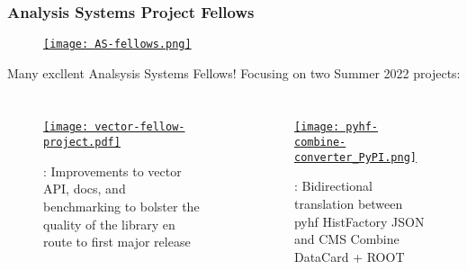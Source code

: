 \begin{frame}
  \frametitle{Analysis Systems Project Fellows}


  \begin{figure}
    \begin{center}
      \href{https://iris-hep.org/as.html}{\texttt{[image: AS-fellows.png]}}
    \end{center}
  \end{figure}

  \begin{center}
    Many excllent Analsysis Systems Fellows! Focusing on two Summer 2022 projects:
  \end{center}

  \begin{columns}
    \begin{figure}
        \begin{center}
            \href{https://iris-hep.org/fellows/Saransh-cpp.html}{\texttt{[image: vector-fellow-project.pdf]}}
        \end{center}
        : Improvements to vector API, docs, and benchmarking to bolster the quality of the library en route to first major release
    \end{figure}
%
    \vspace{10pt}
    \begin{figure}
        \begin{center}
            \href{https://iris-hep.org/fellows/peterridolfi.html}{\texttt{[image: pyhf-combine-converter\_PyPI.png]}}
        \end{center}
        : Bidirectional translation between pyhf HistFactory JSON and CMS Combine DataCard + ROOT
    \end{figure}
  \end{columns}

\end{frame}

